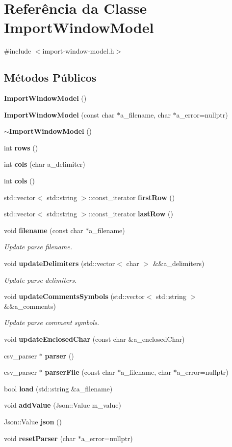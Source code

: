 \section{Referência da Classe Import\+Window\+Model}
\label{class_import_window_model}


{\ttfamily \#include $<$import-\/window-\/model.\+h$>$}

\subsection*{Métodos Públicos}
\begin{DoxyCompactItemize}
\item 
{\bf Import\+Window\+Model} ()
\item 
{\bf Import\+Window\+Model} (const char $\ast$a\+\_\+filename, char $\ast$a\+\_\+error=nullptr)
\item 
{\bf $\sim$\+Import\+Window\+Model} ()
\item 
int {\bf rows} ()
\item 
int {\bf cols} (char a\+\_\+delimiter)
\item 
int {\bf cols} ()
\item 
std\+::vector$<$ std\+::string $>$\+::const\+\_\+iterator {\bf first\+Row} ()
\item 
std\+::vector$<$ std\+::string $>$\+::const\+\_\+iterator {\bf last\+Row} ()
\item 
void {\bf filename} (const char $\ast$a\+\_\+filename)
\begin{DoxyCompactList}\small\item\em Update parse filename. \end{DoxyCompactList}\item 
void {\bf update\+Delimiters} (std\+::vector$<$ char $>$ \&\&a\+\_\+delimiters)
\begin{DoxyCompactList}\small\item\em Update parse delimiters. \end{DoxyCompactList}\item 
void {\bf update\+Comments\+Symbols} (std\+::vector$<$ std\+::string $>$ \&\&a\+\_\+comments)
\begin{DoxyCompactList}\small\item\em Update parse comment symbols. \end{DoxyCompactList}\item 
void {\bf update\+Enclosed\+Char} (const char \&a\+\_\+enclosed\+Char)
\item 
csv\+\_\+parser $\ast$ {\bf parser} ()
\item 
csv\+\_\+parser $\ast$ {\bf parser\+File} (const char $\ast$a\+\_\+filename, char $\ast$a\+\_\+error=nullptr)
\item 
bool {\bf load} (std\+::string \&a\+\_\+filename)
\item 
void {\bf add\+Value} (Json\+::\+Value m\+\_\+value)
\item 
Json\+::\+Value {\bf json} ()
\item 
void {\bf reset\+Parser} (char $\ast$a\+\_\+error=nullptr)
\end{DoxyCompactItemize}
